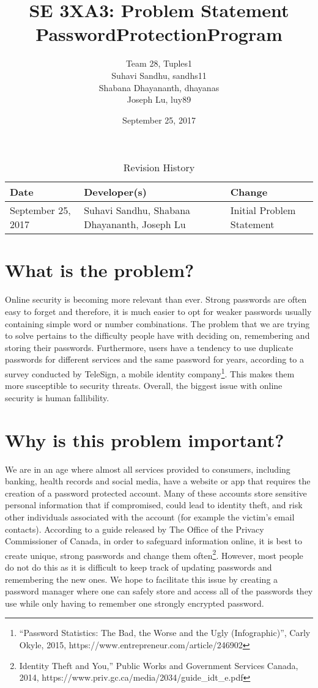 \documentclass{article}
\title{SE 3XA3: Problem Statement\\PasswordProtectionProgram}
\author{Team 28, Tuples1
		\\ Suhavi Sandhu, sandhs11
		\\ Shabana Dhayananth, dhayanas
		\\ Joseph Lu, luy89
}
\date{September 25, 2017}
\begin{document}
\begin{table}[hp]
\caption{Revision History} \label{TblRevisionHistory}
\begin{tabularx}{\textwidth}{llX}
\toprule
\textbf{Date} & \textbf{Developer(s)} & \textbf{Change}\\
\midrule
September 25, 2017 & Suhavi Sandhu, Shabana Dhayananth, Joseph Lu & Initial Problem Statement\\
\bottomrule
\end{tabularx}
\end{table}

\newpage

\maketitle

\section*{What is the problem?}
Online security is becoming more relevant than ever. Strong passwords are often easy to forget and therefore, it is much easier to opt for weaker passwords usually containing simple word or number combinations. The problem that we are trying to solve pertains to the difficulty people have with deciding on, remembering and storing their passwords. Furthermore, users have a tendency to use duplicate passwords for different services and the same password for years, according to a survey conducted by TeleSign, a mobile identity company\footnote{“Password Statistics: The Bad, the Worse and the Ugly (Infographic)”, Carly Okyle, 2015, https://www.entrepreneur.com/article/246902}. This makes them more susceptible to security threats. Overall, the biggest issue with online security is human fallibility.

\section*{Why is this problem important?}
We are in an age where almost all services provided to consumers, including banking, health records and social media, have a website or app that requires the creation of a password protected account. Many of these accounts store sensitive personal information that if compromised, could lead to identity theft, and risk other individuals associated with the account (for example the victim’s email contacts). According to a guide released by The Office of the Privacy Commissioner of Canada, in order to safeguard information online, it is best to create unique, strong passwords and change them often\footnote{Identity Theft and You,” Public Works and Government Services Canada, 2014,  https://www.priv.gc.ca/media/2034/guide\_idt\_e.pdf}. However, most people do not do this as it is difficult to keep track of updating passwords and remembering the new ones. We hope to facilitate this issue by creating a password manager where one can safely store and access all of the passwords they use while only having to remember one strongly encrypted password.
\end{document}
